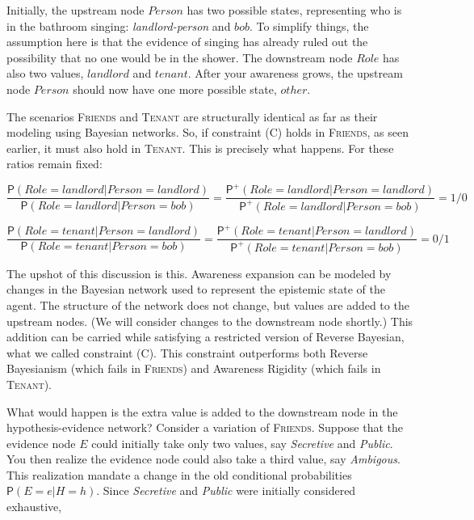 \documentclass[
  11pt,
  dvipsnames,enabledeprecatedfontcommands]{scrartcl}
\newcommand{\pr}[1]{\ensuremath{\mathsf{P}(#1)}}
\newcommand{\ppr}[2]{\ensuremath{\mathsf{P}^{#1}(#2)}}
\begin{document}
\noindent Initially, the upstream node \(Person\) has two possible
states, representing who is in the bathroom singing:
\textit{landlord-person} and \(bob\). To simplify things, the assumption
here is that the evidence of singing has already ruled out the
possibility that no one would be in the shower. The downstream node
\(Role\) has also two values, \(landlord\) and \(tenant\). After your
awareness grows, the upstream node \(Person\) should now have one more
possible state, \(other\).

The scenarios \textsc{Friends} and \textsc{Tenant} are structurally
identical as far as their modeling using Bayesian networks. So, if
constraint (C) holds in \textsc{Friends}, as seen earlier, it must also
hold in \textsc{Tenant}. This is precisely what happens. For these
ratios remain fixed:

\[\frac{\pr{\textit{Role}=\textit{landlord} \vert \textit{Person}=\textit{landlord}}}{\pr{\textit{Role}=\textit{landlord} \vert \textit{Person}=\textit{bob}}} = \frac{\ppr{+}{\textit{Role}=\textit{landlord} \vert \textit{Person}=\textit{landlord}}}{\ppr{+}{\textit{Role}=\textit{landlord} \vert \textit{Person}=\textit{bob}}} = 1/0\]

\[\frac{\pr{\textit{Role}=\textit{tenant} \vert \textit{Person}=\textit{landlord}}}{\pr{\textit{Role}=\textit{tenant} \vert \textit{Person}=\textit{bob}}} = \frac{\ppr{+}{\textit{Role}=\textit{tenant} \vert \textit{Person}=\textit{landlord}}}{\ppr{+}{\textit{Role}=\textit{tenant} \vert \textit{Person}=\textit{bob}}} = 0/1\]

The upshot of this discussion is this. Awareness expansion can be
modeled by changes in the Bayesian network used to represent the
epistemic state of the agent. The structure of the network does not
change, but values are added to the upstream nodes. (We will consider
changes to the downstream node shortly.) This addition can be carried
while satisfying a restricted version of Reverse Bayesian, what we
called constraint (C). This constraint outperforms both Reverse
Bayesianism (which fails in \textsc{Friends}) and Awareness Rigidity
(which fails in \textsc{Tenant}).

What would happen is the extra value is added to the downstream node in
the hypothesis-evidence network? Consider a variation of
\textsc{Friends}. Suppose that the evidence node \(E\) could initially
take only two values, say \textit{Secretive} and \textit{Public}. You
then realize the evidence node could also take a third value, say
\textit{Ambigous}. This realization mandate a change in the old
conditional probabilities \(\pr{E=e \vert H=h}\). Since
\textit{Secretive} and \textit{Public} were initially considered
exhaustive,
\end{document}

